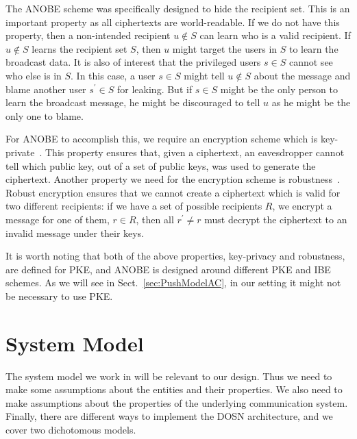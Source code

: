 The \ac{ANOBE} scheme was specifically designed to hide the recipient set.
This is an important property as all ciphertexts are world-readable.
If we do not have this property, then a non-intended recipient \(u\notin S\) 
can learn who is a valid recipient.
If \(u\notin S\) learns the recipient set \(S\), then \(u\) might target the 
users in \(S\) to learn the broadcast data.
It is also of interest that the privileged users \(s\in S\) cannot see who else 
is in \(S\).
In this case, a user \(s\in S\) might tell \(u\notin S\) about the message and 
blame another user \(s^\prime\in S\) for leaking.
But if \(s\in S\) might be the only person to learn the broadcast message, he 
might be discouraged to tell \(u\) as he might be the only one to blame.

For \ac{ANOBE} to accomplish this, we require an encryption scheme which is 
key-private~\cite{KeyPrivacy}.
This property ensures that, given a ciphertext, an eavesdropper cannot tell 
which public key, out of a set of public keys, was used to generate the 
ciphertext.
Another property we need for the encryption scheme is 
robustness~\cite{RobustEncryption}.
Robust encryption ensures that we cannot create a ciphertext which is valid for 
two different recipients:
if we have a set of possible recipients \(R\), we encrypt a message for one of 
them, \(r\in R\), then all \(r^\prime\neq r\) must decrypt the ciphertext to an 
invalid message under their keys.

It is worth noting that both of the above properties, key-privacy and 
robustness, are defined for \ac{PKE}, and \ac{ANOBE} is designed around 
different \ac{PKE} and \ac{IBE} schemes.
As we will see in Sect.~\ref{sec:PushModelAC}, in our setting it might not be 
necessary to use \ac{PKE}.


\section{System Model}\label{sec:SystemModel}

The system model we work in will be relevant to our design.
Thus we need to make some assumptions about the entities and their 
properties.
We also need to make assumptions about the properties of the underlying 
communication system.
Finally, there are different ways to implement the \ac{DOSN} architecture, and 
we cover two dichotomous models.

